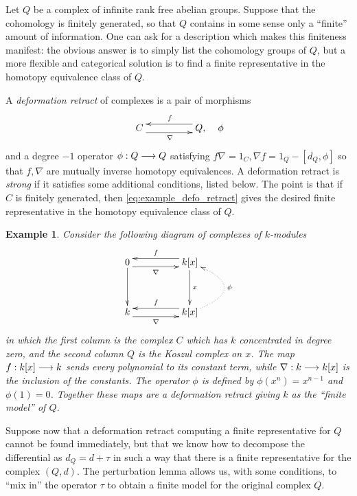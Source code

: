 \documentclass[english,letter paper,12pt,leqno]{article}
\theoremstyle{example}
\newtheorem{example}[theorem]{Example}
\numberwithin{equation}{section}
\begin{document}
Let $Q$ be a complex of infinite rank free abelian groups. Suppose that the cohomology is finitely generated, so that $Q$ contains in some sense only a ``finite'' amount of information. One can ask for a description which makes this finiteness manifest: the obvious answer is to simply list the cohomology groups of $Q$, but a more flexible and categorical solution is to find a finite representative in the homotopy equivalence class of $Q$.

A \emph{deformation retract} of complexes is a pair of morphisms
\begin{equation}\label{eq:example_defo_retract}
\xymatrix@C+2pc{
C \ar@<-1ex>[r]_\nabla & Q, \ar@<-1ex>[l]_f
} \quad \phi
\end{equation}
and a degree $-1$ operator $\phi: Q \longrightarrow Q$ satisfying $f \nabla = 1_C, \nabla f = 1_Q - [d_Q, \phi]$ so that $f, \nabla$ are mutually inverse homotopy equivalences. A deformation retract is \emph{strong} if it satisfies some additional conditions, listed below. The point is that if $C$ is finitely generated, then \eqref{eq:example_defo_retract} gives the desired finite representative in the homotopy equivalence class of $Q$. 

\begin{example}\label{example:koszulsplit} Consider the following diagram of complexes of $k$-modules
\[
\xymatrix@C+2pc@R+1pc{
0 \ar[d] \ar@<-1ex>[r]_-{\nabla} & k[x] \ar@<-1ex>[l]_-{f} \ar[d]^-{x}\\
k \ar@<-1ex>[r]_-{\nabla} & k[x] \ar@<-1ex>[l]_-{f} \ar@/_3pc/@{.>}[u]_-{\phi}
}
\]
in which the first column is the complex $C$ which has $k$ concentrated in degree zero, and the second column $Q$ is the Koszul complex on $x$. The map $f: k[x] \longrightarrow k$ sends every polynomial to its constant term, while $\nabla: k \longrightarrow k[x]$ is the inclusion of the constants. The operator $\phi$ is defined by $\phi( x^n ) = x^{n-1}$ and $\phi(1) = 0$. Together these maps are a deformation retract giving $k$ as the ``finite model'' of $Q$.
\end{example}

Suppose now that a deformation retract computing a finite representative for $Q$ cannot be found immediately, but that we know how to decompose the differential as $d_Q = d + \tau$ in such a way that there is a finite representative for the complex $(Q,d)$. The perturbation lemma allows us, with some conditions, to ``mix in'' the operator $\tau$ to obtain a finite model for the original complex $Q$.
\\
\end{document}
